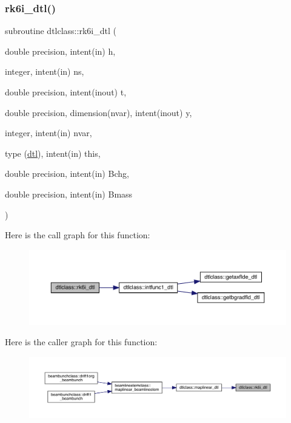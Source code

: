 \subsubsection{\texorpdfstring{rk6i\_dtl()}{rk6i\_dtl()}}
{\footnotesize\ttfamily subroutine dtlclass\+::rk6i\+\_\+dtl (\begin{DoxyParamCaption}\item[{double precision, intent(in)}]{h,  }\item[{integer, intent(in)}]{ns,  }\item[{double precision, intent(inout)}]{t,  }\item[{double precision, dimension(nvar), intent(inout)}]{y,  }\item[{integer, intent(in)}]{nvar,  }\item[{type (\mbox{\hyperlink{namespacedtlclass_structdtlclass_1_1dtl}{dtl}}), intent(in)}]{this,  }\item[{double precision, intent(in)}]{Bchg,  }\item[{double precision, intent(in)}]{Bmass }\end{DoxyParamCaption})}

Here is the call graph for this function\+:\nopagebreak
\begin{figure}[H]
\begin{center}
\leavevmode
\includegraphics[width=350pt]{namespacedtlclass_aa1988f1526102adea7683c31ce2164d9_cgraph}
\end{center}
\end{figure}
Here is the caller graph for this function\+:\nopagebreak
\begin{figure}[H]
\begin{center}
\leavevmode
\includegraphics[width=350pt]{namespacedtlclass_aa1988f1526102adea7683c31ce2164d9_icgraph}
\end{center}
\end{figure}
\mbox{\label{namespacedtlclass_aa8af784d85ac535b6238e9dd4d844be9}} 
